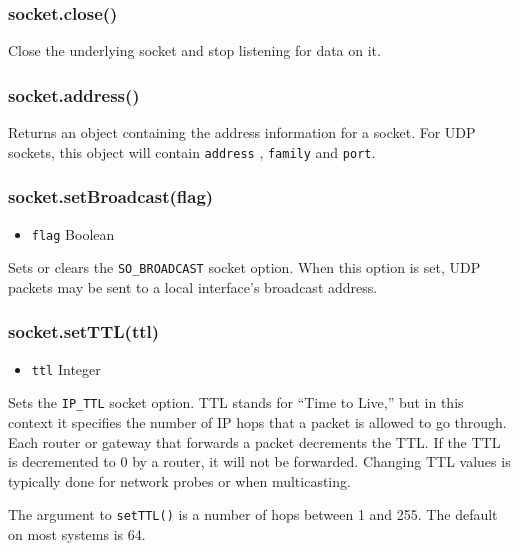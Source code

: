 \subsubsection{socket.close()}\label{socket.close}

Close the underlying socket and stop listening for data on it.

\subsubsection{socket.address()}\label{socket.address}

Returns an object containing the address information for a socket. For
UDP sockets, this object will contain \texttt{address} , \texttt{family}
and \texttt{port}.

\subsubsection{socket.setBroadcast(flag)}\label{socket.setbroadcastflag}

\begin{itemize}
\itemsep1pt\parskip0pt
\item
  \texttt{flag} Boolean
\end{itemize}

Sets or clears the \texttt{SO\_BROADCAST} socket option. When this
option is set, UDP packets may be sent to a local interface's broadcast
address.

\subsubsection{socket.setTTL(ttl)}\label{socket.setttlttl}

\begin{itemize}
\itemsep1pt\parskip0pt
\item
  \texttt{ttl} Integer
\end{itemize}

Sets the \texttt{IP\_TTL} socket option. TTL stands for ``Time to
Live,'' but in this context it specifies the number of IP hops that a
packet is allowed to go through. Each router or gateway that forwards a
packet decrements the TTL. If the TTL is decremented to 0 by a router,
it will not be forwarded. Changing TTL values is typically done for
network probes or when multicasting.

The argument to \texttt{setTTL()} is a number of hops between 1 and 255.
The default on most systems is 64.

